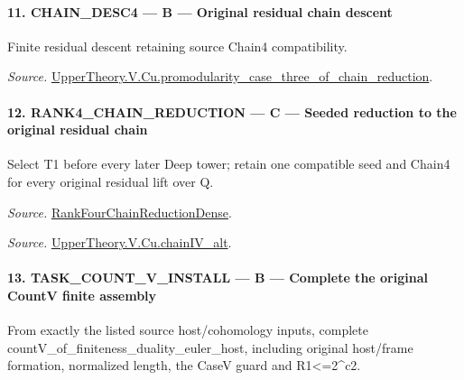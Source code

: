 \paragraph{11. CHAIN\_\allowbreak DESC4 — B — Original residual chain descent}

Finite residual descent retaining source Chain4 compatibility.

\emph{Source.} \href{https://github.com/CocoSgt/riemann-hypothesis-lean/blob/7cbf7a0c32fca1badf05931879a37c3f8a2b03b4/src/Development/AutomorphicArithmetic/AutomorphicVarieties/ModularityArgument/ThresholdArguments/DenseThresholdCases/PromodularityCaseThreeOfLemmas.lean#L131-L153}{UpperTheory.V.Cu.promodularity\_\allowbreak case\_\allowbreak three\_\allowbreak of\_\allowbreak chain\_\allowbreak reduction}.



\paragraph{12. RANK4\_\allowbreak CHAIN\_\allowbreak REDUCTION — C — Seeded reduction to the original residual chain}

Select T1 before every later Deep tower; retain one compatible seed and Chain4 for every original residual lift over Q.

\emph{Source.} \href{https://github.com/CocoSgt/riemann-hypothesis-lean/blob/7cbf7a0c32fca1badf05931879a37c3f8a2b03b4/src/Development/AutomorphicArithmetic/AutomorphicVarieties/ModularityArgument/ThresholdArguments/DenseThresholdCases/PromodularityCaseThree.lean#L33-L39}{RankFourChainReductionDense}.

\emph{Source.} \href{https://github.com/CocoSgt/riemann-hypothesis-lean/blob/7cbf7a0c32fca1badf05931879a37c3f8a2b03b4/src/Development/AutomorphicArithmetic/AutomorphicVarieties/ModularityArgument/ThresholdArguments/DenseThresholdCases/CuPChainIV.lean#L16-L82}{UpperTheory.V.Cu.chainIV\_\allowbreak alt}.



\paragraph{13. TASK\_\allowbreak COUNT\_\allowbreak V\_\allowbreak INSTALL — B — Complete the original CountV finite assembly}

From exactly the listed source host/cohomology inputs, complete countV\_\allowbreak of\_\allowbreak finiteness\_\allowbreak duality\_\allowbreak euler\_\allowbreak host, including original host/frame formation, normalized length, the CaseV guard and R1<=2\textasciicircum{}c2.

